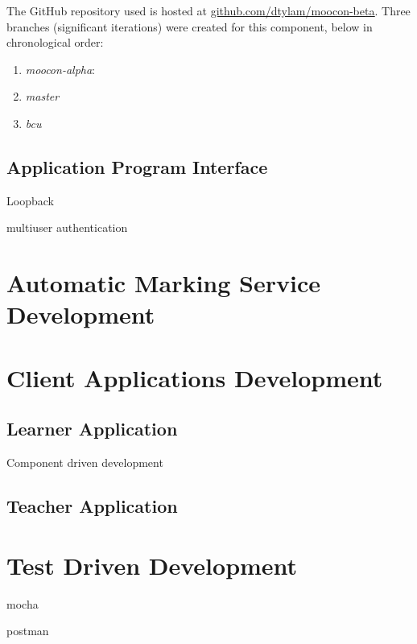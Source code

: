The GitHub repository used is hosted at \href{https://github.com/dtylam/moocon-beta}{\underline{github.com/dtylam/moocon-beta}}.
Three branches (significant iterations) were created for this component, below in chronological order:
\begin{enumerate}
	\setlength\itemsep{0em}
    \item \textit{moocon-alpha}: 
    \item \textit{master}
    \item \textit{bcu}
\end{enumerate}

\subsection{Application Program Interface}

Loopback

multiuser authentication

\section{Automatic Marking Service Development}

\section{Client Applications Development}

\subsection{Learner Application}
Component driven development

\subsection{Teacher Application}


\section{Test Driven Development}

mocha

postman
